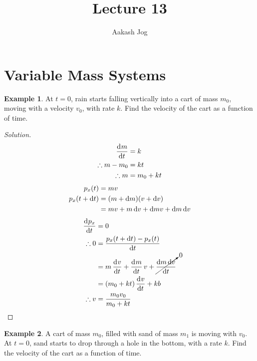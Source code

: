 \documentclass[fleqn, a4paper, 12pt, draft]{article}
\title{Lecture 13}
\author{Aakash Jog}
\date{\formatdate{9}{12}{2014}}
\theoremstyle{definition}
\newtheorem{example}{Example}
\theoremstyle{theorem}
\newenvironment{solution}
{\begin{proof}[Solution]\let\qed\relax}
	{\end{proof}}
\begin{document}
\maketitle

\tableofcontents

\newpage
\section{Variable Mass Systems}

\begin{example}
	At $t = 0$, rain starts falling vertically into a cart of mass $m_0$, moving with a velocity $v_0$, with rate $k$. Find the velocity of the cart as a function of time.
\end{example}

\begin{solution}
	\begin{align*}
		\dod{m}{t} &= k\\
		\therefore m - m_0 &= kt\\
		\therefore m &= m_0 + kt
	\end{align*}
	\begin{align*}
		p_x(t) &= m v\\
		p_x(t + \dif t) &= (m + \dif m) (v + \dif v)\\
		&= m v + m \dif v + \dif m v + \dif m \dif v
	\end{align*}
	\begin{align*}
		\dod{p_x}{t} &= 0\\
		\therefore 0 &= \dfrac{p_x(t + \dif t) - p_x(t)}{\dif t}\\
		&= m \dod{v}{t} + \dod{m}{t} v + \cancelto{0}{\dfrac{\dif m \dif v}{\dif t}}\\
		&= (m_0 + k t) \dod{v}{t} + k b\\
		\therefore v &= \dfrac{m_0 v_0}{m_0 + k t}
	\end{align*}
\end{solution}

\begin{example}
	A cart of mass $m_0$, filled with sand of mass $m_1$ is moving with $v_0$. At $t = 0$, sand starts to drop through a hole in the bottom, with a rate $k$. Find the velocity of the cart as a function of time.
\end{example}
\end{document}
